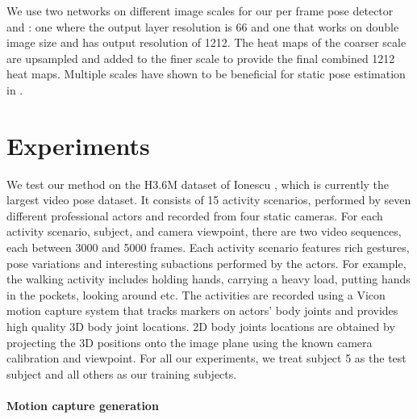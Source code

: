 \documentclass[10pt,twocolumn,letterpaper]{article}
\begin{document}
We use two  networks on different image scales for our per frame pose detector and : one where the output layer  resolution is 66 and one that works on double  image size and has output resolution of 1212. The  heat maps of the coarser scale are upsampled and added to the finer scale to provide the final combined 1212 heat maps. Multiple scales have shown to be beneficial  for static pose estimation  in \cite{vpsKpsTulsianiM14,DBLP:conf/nips/TompsonJLB14,DBLP:journals/corr/ToshevS13}.
  
  








    

\section{Experiments}
We test our method on the H3.6M dataset of Ionescu  \cite{h36m_pami}, which is currently the largest video pose dataset. It consists of 15  activity scenarios, performed by seven  different professional  actors and  recorded from four static cameras. For each activity scenario, subject, and camera viewpoint, there are two video sequences, each  between 3000 and 5000 frames. Each activity scenario features rich gestures, pose variations and interesting subactions  performed by the actors. For example, the walking activity includes holding hands, carrying a heavy load, putting hands in the pockets,  looking around etc. The activities are recorded using a Vicon motion capture system that tracks markers on actors' body joints and provides  high quality 3D body joint locations. 
2D body joints locations are obtained by projecting the 3D positions onto the image plane using the  known camera calibration and viewpoint. For all our experiments, we treat subject 5 as the test subject and all others as our training subjects. 


 
 


\paragraph{Motion capture generation}
\end{document}
